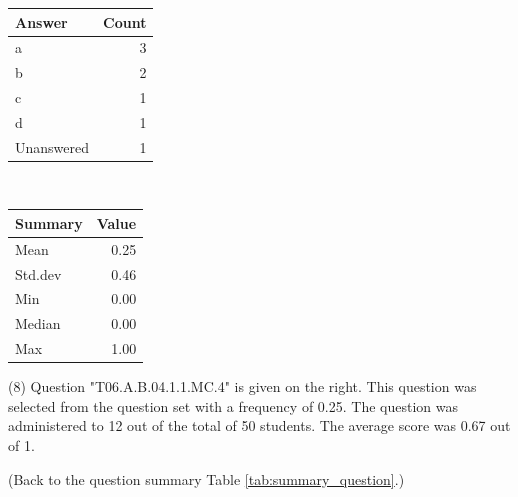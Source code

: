 \documentclass[12pt,english,nohyper]{tufte-handout}\usepackage[]{graphicx}\usepackage[]{color}
\begin{document}
\begin{center}%
\begin{tabular}{lr}
  \hline
Answer & Count \\ 
  \hline
a &   3 \\ 
  b &   2 \\ 
  c &   1 \\ 
  d &   1 \\ 
  Unanswered &   1 \\ 
   \hline
\end{tabular}
~~~~~~~~%
\begin{tabular}{lr}
  \hline
Summary & Value \\ 
  \hline
Mean & 0.25 \\ 
  Std.dev & 0.46 \\ 
  Min & 0.00 \\ 
  Median & 0.00 \\ 
  Max & 1.00 \\ 
   \hline
\end{tabular}
\end{center}\newpage{} (8) Question "T06.A.B.04.1.1.MC.4" is given on the right. This question was selected from the question set with a frequency of 0.25. The question was administered to 12 out of the total of 50 students. The average score was 0.67 out of 1.

 (Back to the question summary Table \ref{tab:summary_question}.)
\end{document}
